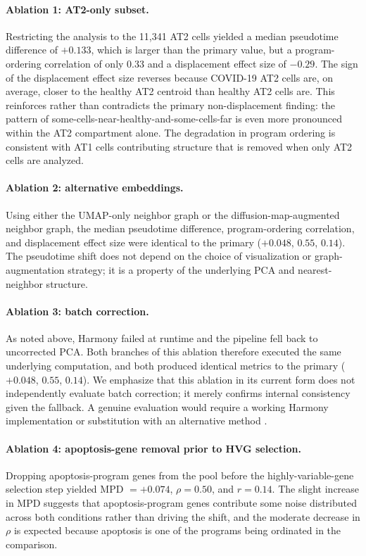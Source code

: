 \documentclass[11pt]{article}
\begin{document}
\paragraph{Ablation 1: AT2-only subset.} Restricting the analysis to the 11{,}341 AT2 cells yielded a median pseudotime difference of $+0.133$, which is larger than the primary value, but a program-ordering correlation of only 0.33 and a displacement effect size of $-0.29$. The sign of the displacement effect size reverses because COVID-19 AT2 cells are, on average, closer to the healthy AT2 centroid than healthy AT2 cells are. This reinforces rather than contradicts the primary non-displacement finding: the pattern of some-cells-near-healthy-and-some-cells-far is even more pronounced within the AT2 compartment alone. The degradation in program ordering is consistent with AT1 cells contributing structure that is removed when only AT2 cells are analyzed.

\paragraph{Ablation 2: alternative embeddings.} Using either the UMAP-only neighbor graph or the diffusion-map-augmented neighbor graph, the median pseudotime difference, program-ordering correlation, and displacement effect size were identical to the primary ($+0.048$, $0.55$, $0.14$). The pseudotime shift does not depend on the choice of visualization or graph-augmentation strategy; it is a property of the underlying PCA and nearest-neighbor structure.

\paragraph{Ablation 3: batch correction.} As noted above, Harmony failed at runtime and the pipeline fell back to uncorrected PCA. Both branches of this ablation therefore executed the same underlying computation, and both produced identical metrics to the primary ($+0.048$, $0.55$, $0.14$). We emphasize that this ablation in its current form does not independently evaluate batch correction; it merely confirms internal consistency given the fallback. A genuine evaluation would require a working Harmony implementation or substitution with an alternative method \citep{Lopez2018, Hie2019, Tran2020}.

\paragraph{Ablation 4: apoptosis-gene removal prior to HVG selection.} Dropping apoptosis-program genes from the pool before the highly-variable-gene selection step yielded MPD $= +0.074$, $\rho = 0.50$, and $r = 0.14$. The slight increase in MPD suggests that apoptosis-program genes contribute some noise distributed across both conditions rather than driving the shift, and the moderate decrease in $\rho$ is expected because apoptosis is one of the programs being ordinated in the comparison.
\end{document}
